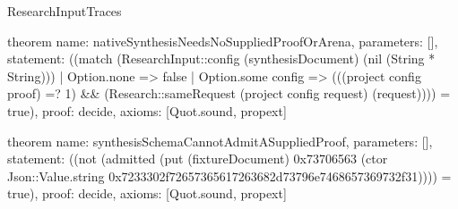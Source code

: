 \begin{lexlean}{ResearchInputTraces}
\begin{semanticmodule}
theorem{
 name: nativeSynthesisNeedsNoSuppliedProofOrArena,
 parameters: [],
 statement: ((match (ResearchInput::config (synthesisDocument) (nil (String * String))) | Option.none => false | Option.some config => (((project config proof) =? 1) && (Research::sameRequest (project config request) (request)))) = true),
 proof: decide{},
 axioms: [Quot.sound, propext]
}

theorem{
 name: synthesisSchemaCannotAdmitASuppliedProof,
 parameters: [],
 statement: ((not (admitted (put (fixtureDocument) 0x73706563 (ctor Json::Value.string 0x7233302f72657365617263682d73796e7468657369732f31)))) = true),
 proof: decide{},
 axioms: [Quot.sound, propext]
}

\end{semanticmodule}
\end{lexlean}
